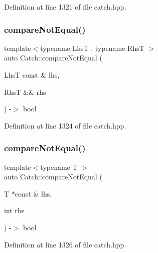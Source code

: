 Definition at line 1321 of file catch.\+hpp.

\mbox{\label{namespace_catch_a8bec217f5ef5f09c17074c311c958f3c}} 
\subsubsection{\texorpdfstring{compare\+Not\+Equal()}{compareNotEqual()}\hspace{0.1cm}{\footnotesize\ttfamily [1/5]}}
{\footnotesize\ttfamily template$<$typename LhsT , typename RhsT $>$ \\
auto Catch\+::compare\+Not\+Equal (\begin{DoxyParamCaption}\item[{LhsT const \&}]{lhs,  }\item[{RhsT \&\&}]{rhs }\end{DoxyParamCaption}) -\/$>$ bool }



Definition at line 1324 of file catch.\+hpp.

\mbox{\label{namespace_catch_aa81c95898f22dce1f61d7710e495d1ee}} 
\subsubsection{\texorpdfstring{compare\+Not\+Equal()}{compareNotEqual()}\hspace{0.1cm}{\footnotesize\ttfamily [2/5]}}
{\footnotesize\ttfamily template$<$typename T $>$ \\
auto Catch\+::compare\+Not\+Equal (\begin{DoxyParamCaption}\item[{T $\ast$const \&}]{lhs,  }\item[{int}]{rhs }\end{DoxyParamCaption}) -\/$>$ bool }



Definition at line 1326 of file catch.\+hpp.

\mbox{\label{namespace_catch_adad6539b3780b9a8953221efd038e2e4}} 
